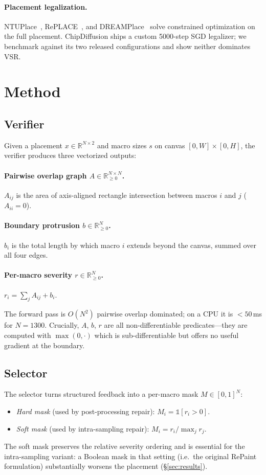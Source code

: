 \documentclass{article}
\begin{document}
\paragraph{Placement legalization.}  NTUPlace~\cite{ntuplace},
RePLACE~\cite{replace}, and DREAMPlace~\cite{dreamplace} solve constrained
optimization on the full placement.  ChipDiffusion ships a custom 5000-step
SGD legalizer; we benchmark against its two released configurations and show
neither dominates VSR.

\section{Method}
\label{sec:method}

\subsection{Verifier}
\label{sec:verifier}

Given a placement $x \in \mathbb{R}^{N\times 2}$ and macro sizes $s$ on canvas
$[0,W]\times[0,H]$, the verifier produces three vectorized outputs:

\paragraph{Pairwise overlap graph $A \in \mathbb{R}^{N\times N}_{\geq 0}$.}
$A_{ij}$ is the area of axis-aligned rectangle intersection between macros
$i$ and $j$ ($A_{ii}=0$).
\paragraph{Boundary protrusion $b \in \mathbb{R}^{N}_{\geq 0}$.}  $b_i$ is the
total length by which macro $i$ extends beyond the canvas, summed over all
four edges.
\paragraph{Per-macro severity $r \in \mathbb{R}^{N}_{\geq 0}$.}  $r_i =
\sum_j A_{ij} + b_i$.

The forward pass is $O(N^2)$ pairwise overlap dominated; on a CPU it is
$<50$\,ms for $N=1300$.  Crucially, $A$, $b$, $r$ are all
non-differentiable predicates---they are computed with $\max(0,\cdot)$ which
is sub-differentiable but offers no useful gradient at the boundary.

\subsection{Selector}
The selector turns structured feedback into a per-macro mask
$M \in [0,1]^N$:
\begin{itemize}
\item \emph{Hard mask} (used by post-processing repair): $M_i = \mathbb{1}[r_i > 0]$.
\item \emph{Soft mask} (used by intra-sampling repair):
$M_i = r_i / \max_j r_j$.
\end{itemize}
The soft mask preserves the relative severity ordering and is essential for
the intra-sampling variant: a Boolean mask in that setting (i.e.\ the original
RePaint formulation) substantially worsens the placement
(\S\ref{sec:results}).
\end{document}

